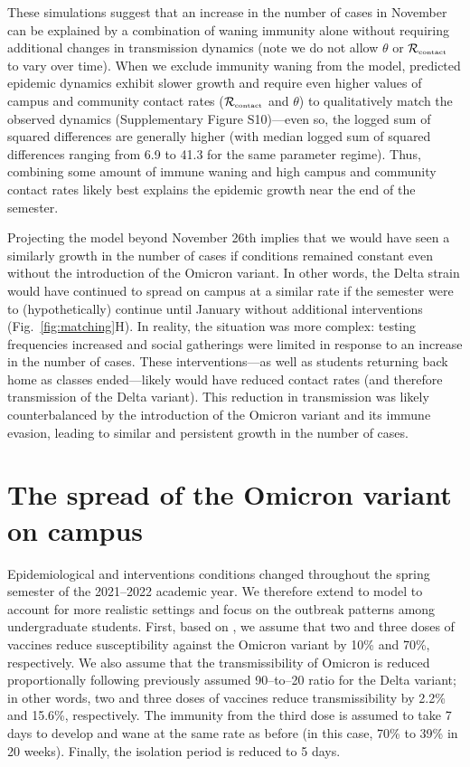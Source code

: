 \documentclass[12pt]{article}
\newcommand{\fref}[1]{Fig.~\ref{fig:#1}}
\newcommand{\Rx}[1]{\ensuremath{{\mathcal R}_{#1}}}
\newcommand{\Rc}{\Rx{\textrm{\tiny{contact}}}}
\begin{document}
These simulations suggest that an increase in the number of cases in November can be explained by a combination of waning immunity alone without requiring additional changes in transmission dynamics (note we do not allow $\theta$ or $\Rc$ to vary over time).
When we exclude immunity waning from the model, predicted epidemic dynamics exhibit slower growth and require even higher values of campus and community contact rates ($\Rc$ and $\theta$) to qualitatively match the observed dynamics (Supplementary Figure S10)---even so, the logged sum of squared differences are generally higher (with median logged sum of squared differences ranging from 6.9 to 41.3 for the same parameter regime).
Thus, combining some amount of immune waning and high campus and community contact rates likely best explains the epidemic growth near the end of the semester.

Projecting the model beyond November 26th implies that we would have seen a similarly growth in the number of cases if conditions remained constant even without the introduction of the Omicron variant.
In other words, the Delta strain would have continued to spread on campus at a similar rate if the semester were to (hypothetically) continue until January without additional interventions (\fref{matching}H).
In reality, the situation was more complex: testing frequencies increased and social gatherings were limited in response to an increase in the number of cases.
These interventions---as well as students returning back home as classes ended---likely would have reduced contact rates (and therefore transmission of the Delta variant).
This reduction in transmission was likely counterbalanced by the introduction of the Omicron variant and its immune evasion, leading to similar and persistent growth in the number of cases.

\section*{The spread of the Omicron variant on campus}

Epidemiological and interventions conditions changed throughout the spring semester of the 2021--2022 academic year.
We therefore extend to model to account for more realistic settings and focus on the outbreak patterns among undergraduate students.
First, based on \citep{ferguson2021report}, we assume that two and three doses of vaccines reduce susceptibility against the Omicron variant by 10\% and 70\%, respectively. 
We also assume that the transmissibility of Omicron is reduced proportionally following previously assumed 90--to--20 ratio for the Delta variant;
in other words, two and three doses of  vaccines reduce transmissibility by 2.2\% and 15.6\%, respectively.
The immunity from the third dose is assumed to take 7 days to develop and wane at the same rate as before (in this case, 70\% to 39\% in 20 weeks).
Finally, the isolation period is reduced to 5 days.
\end{document}
